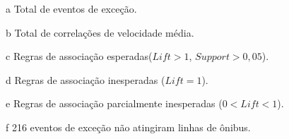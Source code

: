 \documentclass[
	12pt,				%
	oneside,			%
	a4paper,			%
	english,			%
	brazil				%
	]{abntex2ppgsi}
\begin{document}
{{\begin{apendicesenv}
\begin{table}[!htb]
\begin{threeparttable}
\begin{tablenotes}
            \item[a] Total de eventos de exceção.
            \item[b] Total de correlações de velocidade média.
            \item[c] Regras de associação esperadas($Lift > 1$, $Support > 0,05$).
            \item[d] Regras de associação inesperadas ($Lift = 1$).
            \item[e] Regras de associação parcialmente inesperadas ($0 < Lift < 1$).
            \item[f] 216 eventos de exceção não atingiram linhas de ônibus.
        \end{tablenotes}
\end{threeparttable}
\end{table}



\end{apendicesenv}}}
\end{document}
